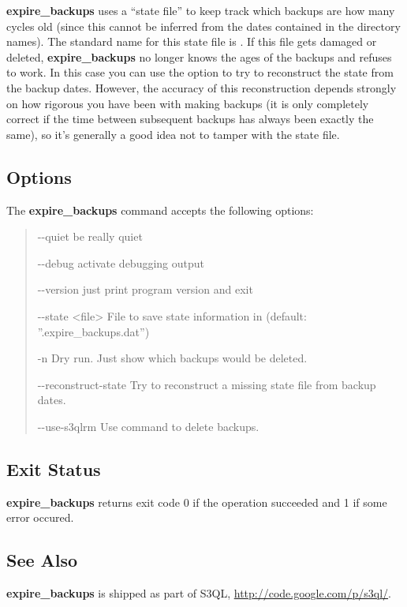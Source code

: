 \documentclass[letterpaper,10pt,english]{sphinxmanual}
\begin{document}
\textbf{expire\_backups} uses a ``state file'' to keep track which
backups are how many cycles old (since this cannot be inferred from
the dates contained in the directory names). The standard name for
this state file is . If this file gets
damaged or deleted, \textbf{expire\_backups} no longer knows the ages
of the backups and refuses to work. In this case you can use the
 option to try to reconstruct the state
from the backup dates. However, the accuracy of this reconstruction
depends strongly on how rigorous you have been with making backups (it
is only completely correct if the time between subsequent backups has
always been exactly the same), so it's generally a good idea not to
tamper with the state file.


\subsection{Options}
\label{man/expire_backups:options}
The \textbf{expire\_backups} command accepts the following options:
\begin{quote}
\begin{optionlist}{3cm}
\item [-{-}quiet]  
be really quiet
\item [-{-}debug]  
activate debugging output
\item [-{-}version]  
just print program version and exit
\item [-{-}state \textless{}file\textgreater{}]  
File to save state information in (default:
''.expire\_backups.dat'')
\item [-n]  
Dry run. Just show which backups would be deleted.
\item [-{-}reconstruct-state]  
Try to reconstruct a missing state file from backup
dates.
\item [-{-}use-s3qlrm]  
Use  command to delete backups.
\end{optionlist}
\end{quote}


\subsection{Exit Status}
\label{man/expire_backups:exit-status}
\textbf{expire\_backups} returns exit code 0 if the operation succeeded and 1 if some
error occured.


\subsection{See Also}
\label{man/expire_backups:see-also}
\textbf{expire\_backups} is shipped as part of S3QL, \href{http://code.google.com/p/s3ql/}{http://code.google.com/p/s3ql/}.
\end{document}

